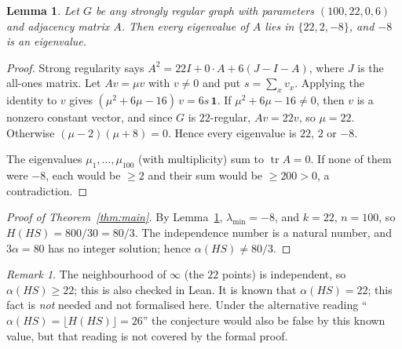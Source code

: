 \documentclass[11pt]{article}
\newtheorem{lemma}[theorem]{Lemma}
\theoremstyle{definition}
\theoremstyle{remark}
\newtheorem{remark}[theorem]{Remark}
\begin{document}
\begin{lemma}\label{lem:eig}
Let $G$ be any strongly regular graph with parameters $(100,22,0,6)$ and adjacency matrix $A$.
Then every eigenvalue of $A$ lies in $\{22,2,-8\}$, and $-8$ is an eigenvalue.
\end{lemma}
\begin{proof}
Strong regularity says $A^2 = 22I + 0\cdot A + 6(J-I-A)$, where $J$ is the all-ones matrix.
Let $Av=\mu v$ with $v\neq 0$ and put $s=\sum_x v_x$. Applying the identity to $v$ gives
$(\mu^2+6\mu-16)\,v = 6s\,\mathbf 1$. If $\mu^2+6\mu-16\ne 0$, then $v$ is a nonzero constant
vector, and since $G$ is $22$-regular, $A v = 22 v$, so $\mu=22$. Otherwise
$(\mu-2)(\mu+8)=0$. Hence every eigenvalue is $22$, $2$ or $-8$.

The eigenvalues $\mu_1,\dots,\mu_{100}$ (with multiplicity) sum to $\operatorname{tr}A=0$. If none
of them were $-8$, each would be $\ge 2$ and their sum would be $\ge 200>0$, a contradiction.
\end{proof}

\begin{proof}[Proof of Theorem~\ref{thm:main}]
By Lemma~\ref{lem:eig}, $\lambda_{\min}=-8$, and $k=22$, $n=100$, so $H(HS)=800/30=80/3$.
The independence number is a natural number, and $3\alpha = 80$ has no integer solution; hence
$\alpha(HS)\ne 80/3$.
\end{proof}

\begin{remark}
The neighbourhood of $\infty$ (the $22$ points) is independent, so $\alpha(HS)\ge 22$; this is
also checked in Lean. It is known that $\alpha(HS)=22$; this fact is \emph{not} needed and not
formalised here. Under the alternative reading ``$\alpha(HS)=\lfloor H(HS)\rfloor=26$'' the
conjecture would also be false by this known value, but that reading is not covered by the
formal proof.
\end{remark}
\end{document}
